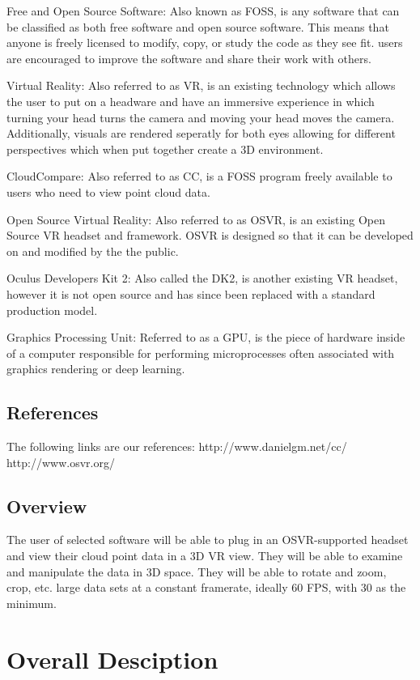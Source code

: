 \documentclass[titlepage]{article}
\begin{document}
Free and Open Source Software: Also known as FOSS, is any software that can be classified as both free software and open source software. This means that anyone is freely licensed to modify, copy, or study the code as they see fit. users are encouraged to improve the software and share their work with others.

Virtual Reality: Also referred to as VR, is an existing technology which allows the user to put on a headware and have an immersive experience in which turning your head turns the camera and moving your head moves the camera.
Additionally, visuals are rendered seperatly for both eyes allowing for different perspectives which when put together create a 3D environment.

CloudCompare: Also referred to as CC, is a FOSS program freely available to users who need to view point cloud data.

Open Source Virtual Reality: Also referred to as OSVR, is an existing Open Source VR headset and framework. OSVR is designed so that it can be developed on and modified by the the public.

Oculus Developers Kit 2: Also called the DK2, is another existing VR headset, however it is not open source and has since been replaced with a standard production model.

Graphics Processing Unit: Referred to as a GPU, is the piece of hardware inside of a computer responsible for performing microprocesses often associated with graphics rendering or deep learning.

\subsection{References}

The following links are our references:
  http://www.danielgm.net/cc/
  http://www.osvr.org/

\subsection{Overview}

The user of selected software will be able to plug in an OSVR-supported headset and view their cloud point data in a 3D VR view.
They will be able to examine and manipulate the data in 3D space. They will be able to rotate and zoom, crop, etc. large data
sets at a constant framerate, ideally 60 FPS, with 30 as the minimum. 

\section{Overall Desciption}
\end{document}

